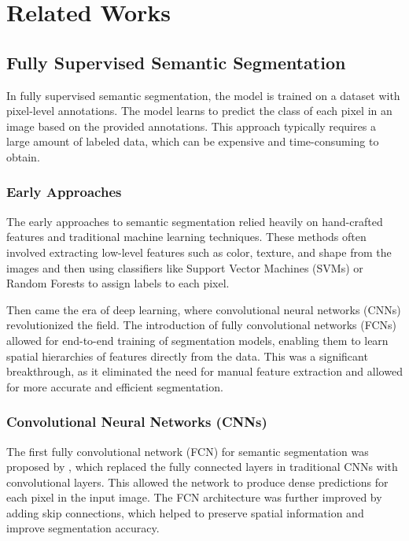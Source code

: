 \chapter {Related Works}
\label{chap:related-works}

\section{Fully Supervised Semantic Segmentation}
\label{sec:fully-supervised}

In fully supervised semantic segmentation, the model is trained on a dataset with pixel-level annotations. The model learns to predict the class of each pixel in an image based on the provided annotations. This approach typically requires a large amount of labeled data, which can be expensive and time-consuming to obtain.

\subsection{Early Approaches}
\label{subsec:early-approaches}
The early approaches to semantic segmentation relied heavily on hand-crafted features and traditional machine learning techniques. These methods often involved extracting low-level features such as color, texture, and shape from the images and then using classifiers like Support Vector Machines (SVMs) or Random Forests to assign labels to each pixel.

Then came the era of deep learning, where convolutional neural networks (CNNs) revolutionized the field. The introduction of fully convolutional networks (FCNs) allowed for end-to-end training of segmentation models, enabling them to learn spatial hierarchies of features directly from the data. This was a significant breakthrough, as it eliminated the need for manual feature extraction and allowed for more accurate and efficient segmentation.

\subsection{Convolutional Neural Networks (CNNs)}
\label{subsec:cnn_sem_seg}

The first fully convolutional network (FCN) for semantic segmentation was proposed by \cite{fsss_fcn}, which replaced the fully connected layers in traditional CNNs with convolutional layers. This allowed the network to produce dense predictions for each pixel in the input image. The FCN architecture was further improved by adding skip connections, which helped to preserve spatial information and improve segmentation accuracy.

